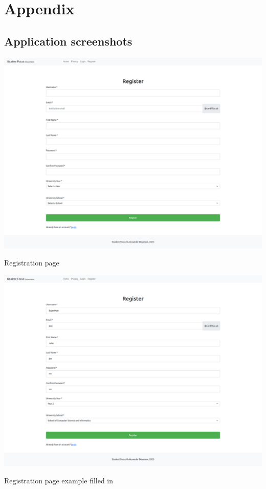 \chapter{Appendix}

\section{Application screenshots}

\includegraphics[scale=0.20]{images/application/1 - register.png}

Registration page

\includegraphics[scale=0.20]{images/application/2 - register_filed_in.png}

Registration page example filled in

